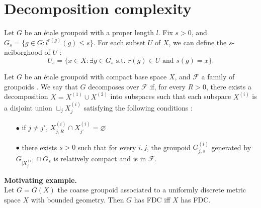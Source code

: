 \section{Decomposition complexity}

Let $G$ be an étale groupoid with a proper length $l$. Fix $s>0$, and $G_s=\{g\in G : l^{r(g)}(g)\leq s\}$. For each subset $U$ of $X$, we can define the $s$-neiborghood of $U$ :
\[U_s = \{x\in X : \exists g\in G_s \text{ s.t. } r(g)\in U \text{ and } s(g)=x \}.\]

\begin{definition}
Let $G$ be an étale groupoid with compact base space $X$, and $\mathcal F$ a family of groupoids . We say that $G$ decomposes over $\mathcal F$ if, for every $R>0$, there exists a decomposition $X=X^{(1)}\cup X^{(2)}$ into subspaces such that each subspace $X^{(i)}$ is a disjoint union $\sqcup_j X^{(i)}_j$ satisfying the following conditions :
\begin{itemize}
\item[$\bullet$] if $j\neq j'$,  $X^{(i)}_{j,R}\cap X^{(i)}_{j'}=\varnothing$
\item[$\bullet$] there exists $s>0$ such that for every $i,j$, the groupoid $G_{j,s}^{(i)}$ generated by $G_{|X^{(i)}_j}\cap G_s$ is relatively compact and is in $\mathcal F$.
\end{itemize}
\end{definition}

\textbf{Motivating example.}\\
Let $G=G(X)$ the coarse groupoid associated to a uniformly discrete metric space $X$ with bounded geometry. Then $G$ has FDC iff $X$ has FDC.\\

